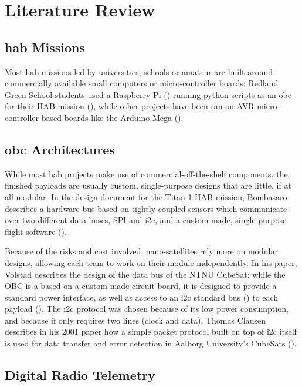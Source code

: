 \chapter{Literature Review}
\label{ch:literature-review}

\section{\acrlong{hab} Missions}

Most \acrshort{hab} missions led by universities, schools or amateur are built 
around commercially available small computers or micro-controller boards:
Redland Green School students used a Raspberry Pi (\cite{rpi2014}) running
python scripts as an \acrfull{obc} for their HAB mission
(\cite{Hinschelwood2015}), while other projects have been ran on AVR
micro-controller based boards like the Arduino Mega
(\cite{AtmelCorporation2015}).

\section{\acrlong{obc} Architectures}

While most \acrshort{hab} projects make use of commercial-off-the-shelf
components, the finished payloads are usually custom, single-purpose designs
that are little, if at all modular. In the design document for the Titan-1 HAB
mission, Bombasaro describes a hardware bus based on tightly coupled sensors
which communicate over two different data buses, SPI and \acrshort{i2c}, and a
custom-made, single-purpose flight software (\cite{Bombasaro2015}).

Because of the risks and cost involved, nano-satellites rely more on modular
designs, allowing each team to work on their module independently. In his paper,
Volstad describes the design of the data bus of the NTNU CubeSat: while the OBC
is a based on a custom made circuit board, it is designed to provide a standard
power interface, as well as access to an \acrshort{i2c} standard bus
(\cite{NXPSemiconductors2014}) to each payload (\cite{Volstad2011}). The
\acrshort{i2c} protocol was chosen because of its low power consumption, and
because if only requires two lines (clock and data). Thomas Clausen describes
in his 2001 paper how a simple packet protocol built on top of \acrshort{i2c}
itself is used for data transfer and error detection in Aalborg University's
CubeSats (\cite{Clausen2001}).

\section{Digital Radio Telemetry}


